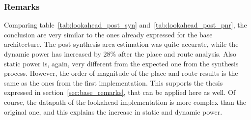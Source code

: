 \documentclass[a4paper]{article}
\begin{document}
\subsubsection{Remarks}
Comparing table~\ref{tab:lookahead_post_syn} and~\ref{tab:lookahead_post_pnr}, the conclusion are very similar to the ones already expressed for the base architecture. The post-synthesis area estimation was quite accurate, while the dynamic power has increased by $28\%$ after the place and route analysis. Also static power is, again, very different from the expected one from the synthesis process. However, the order of magnitude of the place and route results is the same as the ones from the first implementation. This supports the thesis expressed in section~\ref{sec:base_remarks}, that can be applied here as well. Of course, the datapath of the lookahead implementation is more complex than the original one, and this explains the increase in static and dynamic power. 
\end{document}
